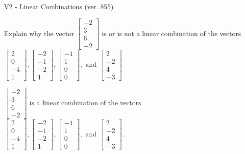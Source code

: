 \begin{exercise}
  \begin{exerciseTitle}V2 - Linear Combinations (ver. 855)\end{exerciseTitle}
  \begin{exerciseStatement}
    Explain why the vector \(\left[\begin{array}{c}
-2 \\
3 \\
6 \\
-2
\end{array}\right]\)  is or is not a linear 
	combination of the vectors \(\left[\begin{array}{c}
2 \\
0 \\
-4 \\
1
\end{array}\right] , \left[\begin{array}{c}
-2 \\
-1 \\
-2 \\
1
\end{array}\right] , \left[\begin{array}{c}
-1 \\
1 \\
0 \\
0
\end{array}\right] , \text{ and } \left[\begin{array}{c}
2 \\
-2 \\
4 \\
-3
\end{array}\right]\).
	


  \end{exerciseStatement}
  \begin{exerciseAnswer}
   \(\left[\begin{array}{c}
-2 \\
3 \\
6 \\
-2
\end{array}\right]\) 
  	 is  
	a linear combination of the vectors \(\left[\begin{array}{c}
2 \\
0 \\
-4 \\
1
\end{array}\right] , \left[\begin{array}{c}
-2 \\
-1 \\
-2 \\
1
\end{array}\right] , \left[\begin{array}{c}
-1 \\
1 \\
0 \\
0
\end{array}\right] , \text{ and } \left[\begin{array}{c}
2 \\
-2 \\
4 \\
-3
\end{array}\right]\).


\end{exerciseAnswer}
\end{exercise}
